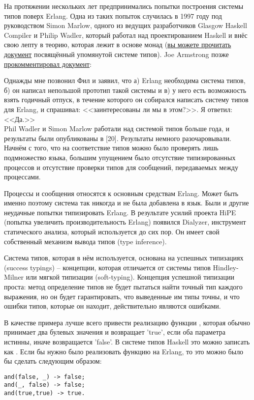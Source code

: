 На протяжении нескольких лет предпринимались попытки построения системы типов поверх Erlang. Одна из таких попыток случилась в 1997 году под руководством Simon Marlow, одного из ведущих разработчиков Glasgow Haskell Compiler и Philip Wadler, который работал над проектированием Haskell и внёс свою лепту в теорию, которая лежит в основе монад (\href{http://www.haskell.org/~simonmar/papers/erltc.pdf}{вы можете прочитать документ} посвящённый упомянутой системе типов). Joe Armstrong позже \href{http://www.cs.chalmers.se/Cs/Grundutb/Kurser/ppxt/HT2007/general/languages/armstrong-erlang\_history.pdf}{прокомментировал документ}:\\
\colorbox{lgray}
{
    \begin{minipage}{\linewidth}
Однажды мне позвонил Фил и заявил, что а) Erlang необходима система типов, б) он написал непольшой прототип такой системы и в) у него есть возможность взять годичный отпуск, в течение которого он собирался написать систему типов для Erlang, и спрашивал: <<заинтересованы ли мы в этом?>>. Я ответил: <<Да.>>\\
Phil Wadler и Simon Marlow работали над системой типов больше года, и результаты были опубликованы в [20]. Результаты немного разочаровывали. Начнём с того, что на соответствие типов можно было проверять лишь подмножество языка, большим упущением было отсутствие типизированных процессов и отсутствие проверки типов для сообщений, передаваемых между процессами.
    \end{minipage}
}

Процессы и сообщения относятся к основным средствам Erlang. Может быть именно поэтому система так никогда и не была добавлена в язык. Были и другие неудачные попытки типизировать Erlang. В результате усилий проекта HiPE (попытка увеличить производительность Erlang) появился Dialyzer, инструмент статического анализа, который используется до сих пор. Он имеет свой собственный механизм вывода типов (type inference).

Система типов, которая в нём используется, основана на успешных типизациях (success typings) \--- концепции, которая отличается от системы типов Hindley\--Milner или мягкой типизации (soft\--typing). Концепция успешной типизации проста: метод определение типов не будет пытаться найти точный тип каждого выражения, но он будет гарантировать, что выведенные им типы точны, и что ошибки типов, которые он находит, действительно являются ошибками.

В качестве примера лучше всего привести реализацию функции , которая обычно принимает два булевых значения и возвращает 'true', если оба параметра истинны, иначе возвращается 'false'. В системе типов Haskell это можно записать как . Если бы нужно было реализовать функцию  на Erlang, то это можно было бы сделать следующим образом:
\begin{lstlisting}[style=erlang]
and(false, _) -> false;
and(_, false) -> false;
and(true,true) -> true.
\end{lstlisting}

